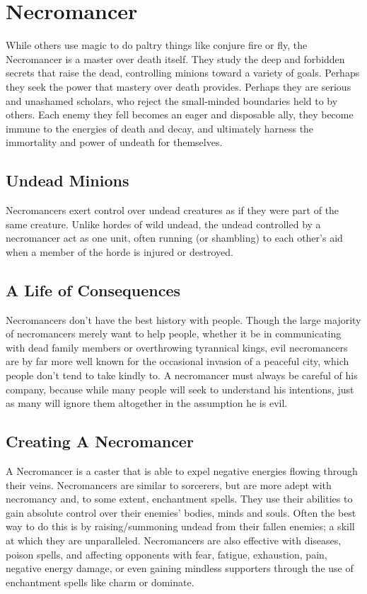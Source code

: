 \documentclass[10pt,twoside,twocolumn,openany]{book}
\begin{document}
\section{Necromancer}
While others use magic to do paltry things like conjure fire or fly, the Necromancer is a master over death itself. They study the deep and forbidden secrets that raise the dead, controlling minions toward a variety of goals. Perhaps they seek the power that mastery over death provides. Perhaps they are serious and unashamed scholars, who reject the small-minded boundaries held to by others. Each enemy they fell becomes an eager and disposable ally, they become immune to the energies of death and decay, and ultimately harness the immortality and power of undeath for themselves.

\subsection{Undead Minions}
Necromancers exert control over undead creatures as if they were part of the same creature. Unlike hordes of wild undead, the undead controlled by a necromancer act as one unit, often running (or shambling) to each other’s aid when a member of the horde is injured or destroyed.


\subsection{A Life of Consequences}
Necromancers don’t have the best history with people. Though the large majority of necromancers merely want to help people, whether it be in communicating with dead family members or overthrowing tyrannical kings, evil necromancers are by far more well known for the occasional invasion of a peaceful city, which people don’t tend to take kindly to.
\newpage
A necromancer must always be careful of his company, because while many people will seek to understand his intentions, just as many will ignore them altogether in the assumption he is evil.

\subsection{Creating A Necromancer}
A Necromancer is a caster that is able to expel negative energies flowing through their veins. Necromancers are similar to sorcerers, but are more adept with necromancy and, to some extent, enchantment spells. They use their abilities to gain absolute control over their enemies' bodies, minds and souls. Often the best way to do this is by raising/summoning undead from their fallen enemies; a skill at which they are unparalleled. Necromancers are also effective with diseases, poison spells, and affecting opponents with fear, fatigue, exhaustion, pain, negative energy damage, or even gaining mindless supporters through the use of enchantment spells like charm or dominate.
\end{document}
